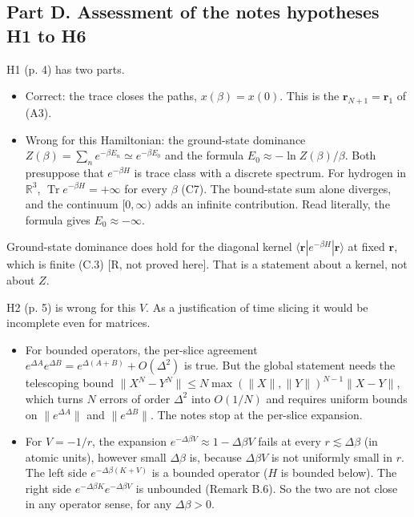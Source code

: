 \documentclass[11pt,a4paper]{article}
\providecommand{\tightlist}{\setlength{\itemsep}{0pt}\setlength{\parskip}{0pt}}
\begin{document}
\hypertarget{part-d.-assessment-of-the-notes-hypotheses-h1-to-h6}{%
\subsection{Part D. Assessment of the notes\textquotesingle{} hypotheses H1 to H6}\label{part-d.-assessment-of-the-notes-hypotheses-h1-to-h6}}

H1 (p. 4) has two parts.

\begin{itemize}
\tightlist
\item
  Correct: the trace closes the paths, \(x(\beta)=x(0)\). This is the \(\mathbf r_{N+1}=\mathbf r_1\) of (A3).
\item
  Wrong for this Hamiltonian: the ground-state dominance \(Z(\beta)=\sum_ne^{-\beta E_n}\simeq e^{-\beta E_0}\) and the formula \(E_0\approx-\ln Z(\beta)/\beta\). Both presuppose that \(e^{-\beta H}\) is trace class with a discrete spectrum. For hydrogen in \(\mathbb R^3\), \(\operatorname{Tr}e^{-\beta H}=+\infty\) for every \(\beta\) (C7). The bound-state sum alone diverges, and the continuum \([0,\infty)\) adds an infinite contribution. Read literally, the formula gives \(E_0\approx-\infty\).
\end{itemize}

Ground-state dominance does hold for the diagonal kernel \(\langle\mathbf r|e^{-\beta H}|\mathbf r\rangle\) at fixed \(\mathbf r\), which is finite (C.3) {[}R, not proved here{]}. That is a statement about a kernel, not about \(Z\).

H2 (p. 5) is wrong for this \(V\). As a justification of time slicing it would be incomplete even for matrices.

\begin{itemize}
\tightlist
\item
  For bounded operators, the per-slice agreement \(e^{\Delta A}e^{\Delta B}=e^{\Delta(A+B)}+O(\Delta^2)\) is true. But the global statement needs the telescoping bound \(\|X^N-Y^N\|\le N\max(\|X\|,\|Y\|)^{N-1}\|X-Y\|\), which turns \(N\) errors of order \(\Delta^2\) into \(O(1/N)\) and requires uniform bounds on \(\|e^{\Delta A}\|\) and \(\|e^{\Delta B}\|\). The notes stop at the per-slice expansion.
\item
  For \(V=-1/r\), the expansion \(e^{-\Delta\beta V}\approx1-\Delta\beta V\) fails at every \(r\lesssim\Delta\beta\) (in atomic units), however small \(\Delta\beta\) is, because \(\Delta\beta V\) is not uniformly small in \(r\). The left side \(e^{-\Delta\beta(K+V)}\) is a bounded operator (\(H\) is bounded below). The right side \(e^{-\Delta\beta K}e^{-\Delta\beta V}\) is unbounded (Remark B.6). So the two are not close in any operator sense, for any \(\Delta\beta>0\).
\end{itemize}
\end{document}
